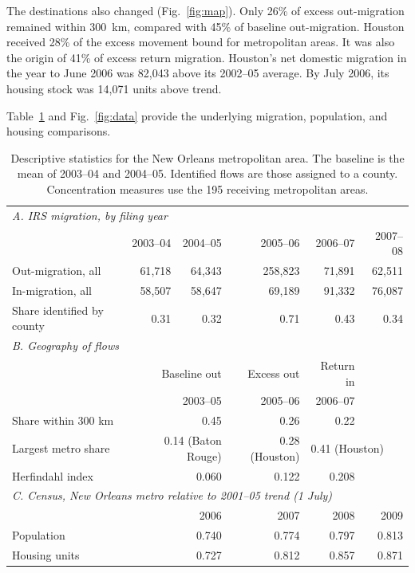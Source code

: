 \documentclass[11pt]{article}
\begin{document}
The destinations also changed (Fig.~\ref{fig:map}). Only 26\% of excess out-migration remained within 300~km, compared with 45\% of baseline out-migration. Houston received 28\% of the excess movement bound for metropolitan areas. It was also the origin of 41\% of excess return migration. Houston's net domestic migration in the year to June 2006 was 82{,}043 above its 2002--05 average. By July 2006, its housing stock was 14{,}071 units above trend.

Table~\ref{tab:desc} and Fig.~\ref{fig:data} provide the underlying migration, population, and housing comparisons.

\begin{table}[tbp]
\centering\small
\caption{Descriptive statistics for the New Orleans metropolitan area. The baseline is the mean of 2003--04 and 2004--05. Identified flows are those assigned to a county. Concentration measures use the 195 receiving metropolitan areas.}
\label{tab:desc}
\begin{tabular}{lrrrrr}
\toprule
\multicolumn{6}{l}{\emph{A. IRS migration, by filing year}}\\
& 2003--04 & 2004--05 & 2005--06 & 2006--07 & 2007--08\\
\midrule
Out-migration, all & 61{,}718 & 64{,}343 & 258{,}823 & 71{,}891 & 62{,}511\\
In-migration, all & 58{,}507 & 58{,}647 & 69{,}189 & 91{,}332 & 76{,}087\\
Share identified by county & 0.31 & 0.32 & 0.71 & 0.43 & 0.34\\
\midrule
\multicolumn{6}{l}{\emph{B. Geography of flows}}\\
& \multicolumn{2}{r}{Baseline out} & Excess out & Return in & \\
& \multicolumn{2}{r}{2003--05} & 2005--06 & 2006--07 & \\
\midrule
Share within 300 km & \multicolumn{2}{r}{0.45} & 0.26 & 0.22 & \\
Largest metro share & \multicolumn{2}{r}{0.14 (Baton Rouge)} & 0.28 (Houston) & \multicolumn{2}{l}{0.41 (Houston)}\\
Herfindahl index & \multicolumn{2}{r}{0.060} & 0.122 & 0.208 & \\
\midrule
\multicolumn{6}{l}{\emph{C. Census, New Orleans metro relative to 2001--05 trend (1 July)}}\\
& & 2006 & 2007 & 2008 & 2009\\
\midrule
Population & & 0.740 & 0.774 & 0.797 & 0.813\\
Housing units & & 0.727 & 0.812 & 0.857 & 0.871\\
\bottomrule
\end{tabular}
\end{table}
\end{document}
